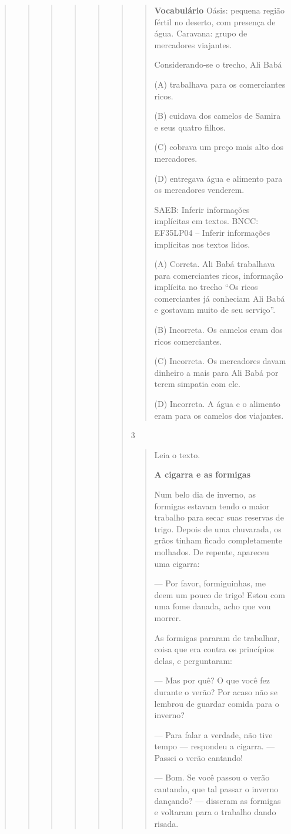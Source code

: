 \begin{boxlist}
{{\begin{quote}
\begin{quote}
\begin{quote}
{\begin{quote}
{\begin{quote}
\begin{quote}
\begin{quote}
\textbf{Vocabulário}
Oásis: pequena região fértil no deserto, com presença de água.
Caravana: grupo de mercadores viajantes.

Considerando-se o trecho, Ali Babá

(A) trabalhava para os comerciantes ricos.

(B) cuidava dos camelos de Samira e seus quatro filhos.

(C) cobrava um preço mais alto dos mercadores.

(D) entregava água e alimento para os mercadores venderem.

SAEB: Inferir informações implícitas em textos.
BNCC: EF35LP04 -- Inferir informações implícitas nos textos lidos.

(A) Correta. Ali Babá trabalhava para comerciantes ricos, informação
implícita no trecho ``Os ricos comerciantes já conheciam Ali Babá e
gostavam muito de seu serviço''.

(B) Incorreta. Os camelos eram dos ricos comerciantes.

(C) Incorreta. Os mercadores davam dinheiro a mais para Ali Babá por
terem simpatia com ele.

(D) Incorreta. A água e o alimento eram para os camelos dos viajantes.
\end{quote}

\num{3}

\begin{quote}
Leia o texto.

\textbf{A cigarra e as formigas}

Num belo dia de inverno, as formigas estavam tendo o maior
trabalho para secar suas reservas de trigo. Depois de uma
chuvarada, os grãos tinham ficado completamente molhados. De
repente, apareceu uma cigarra:

--- Por favor, formiguinhas, me deem um pouco de
trigo! Estou com uma fome danada, acho que vou morrer.

As formigas pararam de trabalhar, coisa que era contra
os princípios delas, e perguntaram:

--- Mas por quê? O que você fez durante o verão? Por
acaso não se lembrou de guardar comida para o inverno?

--- Para falar a verdade, não tive tempo --- respondeu
a cigarra. --- Passei o verão cantando!

--- Bom. Se você passou o verão cantando, que tal
passar o inverno dançando? --- disseram as formigas e
voltaram para o trabalho dando risada.


\end{quote}
\end{quote}
\end{quote}}
\end{quote}}
\end{quote}
\end{quote}
\end{quote}}}
\end{boxlist}
